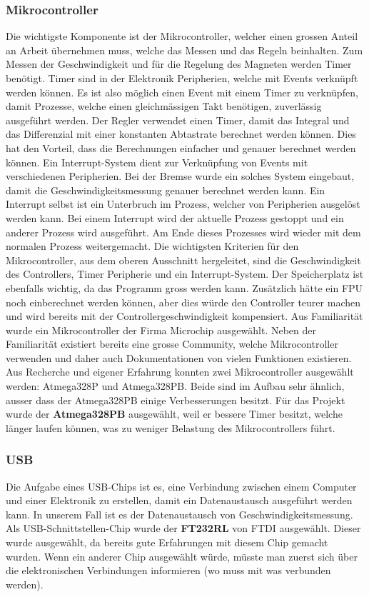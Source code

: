 \subsubsection{Mikrocontroller}
Die wichtigste Komponente ist der Mikrocontroller, welcher einen grossen Anteil an Arbeit übernehmen muss, welche das Messen und das Regeln beinhalten. Zum Messen der Geschwindigkeit und für die Regelung des Magneten werden Timer benötigt. Timer sind in der Elektronik Peripherien, welche mit Events verknüpft werden können. Es ist also möglich einen Event mit einem Timer zu verknüpfen, damit Prozesse, welche einen gleichmässigen Takt benötigen, zuverlässig ausgeführt werden. Der Regler verwendet einen Timer, damit das Integral und das Differenzial mit einer konstanten Abtastrate berechnet werden können. Dies hat den Vorteil, dass die Berechnungen einfacher und genauer berechnet werden können.
\newpara
Ein Interrupt-System dient zur Verknüpfung von Events mit verschiedenen Peripherien. Bei der Bremse wurde ein solches System eingebaut, damit die Geschwindigkeitsmessung genauer berechnet werden kann. Ein Interrupt selbst ist ein Unterbruch im Prozess, welcher von Peripherien ausgelöst werden kann. Bei einem Interrupt wird der aktuelle Prozess gestoppt und ein anderer Prozess wird ausgeführt. Am Ende dieses Prozesses wird wieder mit dem normalen Prozess weitergemacht.
\newpara
Die wichtigsten Kriterien für den Mikrocontroller, aus dem oberen Ausschnitt hergeleitet, sind die Geschwindigkeit des Controllers, Timer Peripherie und ein Interrupt-System. Der Speicherplatz ist ebenfalls wichtig, da das Programm gross werden kann. Zusätzlich hätte ein FPU noch einberechnet werden können, aber dies würde den Controller teurer machen und wird bereits mit der Controllergeschwindigkeit kompensiert. 
\newpara
Aus Familiarität wurde ein Mikrocontroller der Firma Microchip ausgewählt. Neben der Familiarität existiert bereits eine grosse Community, welche Mikrocontroller verwenden und daher auch Dokumentationen von vielen Funktionen existieren. Aus Recherche und eigener Erfahrung konnten zwei Mikrocontroller ausgewählt werden: Atmega328P und Atmega328PB. Beide sind im Aufbau sehr ähnlich, ausser dass der Atmega328PB einige Verbesserungen besitzt.
\newpara
Für das Projekt wurde der \textbf{Atmega328PB} ausgewählt, weil er bessere Timer besitzt, welche länger laufen können, was zu weniger Belastung des Mikrocontrollers führt.
\subsubsection{USB}
Die Aufgabe eines USB-Chips ist es, eine Verbindung zwischen einem Computer und einer Elektronik zu erstellen, damit ein Datenaustausch ausgeführt werden kann. In unserem Fall ist es der Datenaustausch von Geschwindigkeitsmessung.
\newpara
Als USB-Schnittstellen-Chip wurde der \textbf{FT232RL} von FTDI ausgewählt. Dieser wurde ausgewählt, da bereits gute Erfahrungen mit diesem Chip gemacht wurden. Wenn ein anderer Chip ausgewählt würde, müsste man zuerst sich über die elektronischen Verbindungen informieren (wo muss mit was verbunden werden).

